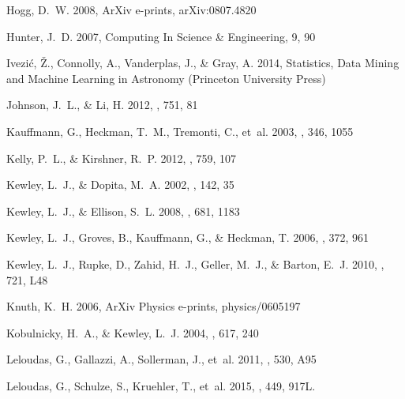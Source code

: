 \documentclass{emulateapj}
\begin{document}
\begin{thebibliography}{}
{Hogg}, D.~W. 2008, ArXiv e-prints, arXiv:0807.4820

Hunter, J.~D. 2007, Computing In Science \& Engineering, 9, 90

{Ivezi{\'c}}, {\v Z}., {Connolly}, A., {Vanderplas}, J., \& {Gray}, A. 2014,
  Statistics, Data Mining and Machine Learning in Astronomy (Princeton
  University Press)

{Johnson}, J.~L., \& {Li}, H. 2012, \apj, 751, 81

{Kauffmann}, G., {Heckman}, T.~M., {Tremonti}, C., {et~al.} 2003, \mnras, 346,
  1055

{Kelly}, P.~L., \& {Kirshner}, R.~P. 2012, \apj, 759, 107

{Kewley}, L.~J., \& {Dopita}, M.~A. 2002, \apjs, 142, 35

{Kewley}, L.~J., \& {Ellison}, S.~L. 2008, \apj, 681, 1183

{Kewley}, L.~J., {Groves}, B., {Kauffmann}, G., \& {Heckman}, T. 2006, \mnras,
  372, 961

{Kewley}, L.~J., {Rupke}, D., {Zahid}, H.~J., {Geller}, M.~J., \& {Barton},
  E.~J. 2010, \apjl, 721, L48

{Knuth}, K.~H. 2006, ArXiv Physics e-prints, physics/0605197

{Kobulnicky}, H.~A., \& {Kewley}, L.~J. 2004, \apj, 617, 240

{Leloudas}, G., {Gallazzi}, A., {Sollerman}, J., {et~al.} 2011, \aap, 530, A95

{Leloudas}, G., {Schulze}, S., {Kruehler}, T., {et~al.} 2015, \mnras, 449, 917L. 


\end{thebibliography}
\end{document}
